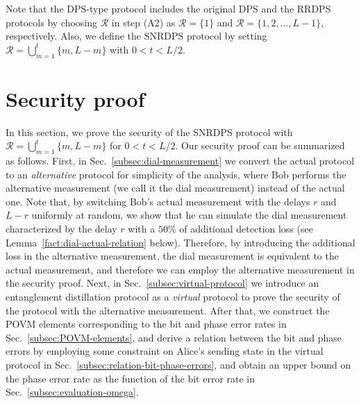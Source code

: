 \documentclass[twocolumn,superscriptaddress,pra,footinbib,notitlepage]{revtex4-1}
\newcommand{\1}{\mbox{1}\hspace{-0.25em}\mbox{l}}
\begin{document}
Note that the DPS-type protocol includes the original DPS and the RRDPS protocols by choosing $\mathcal{R}$ in step (A2) as $\mathcal{R}=\{1\}$ and $\mathcal{R}=\{1, 2, \dots, L-1\}$, respectively. 
Also, we define the SNRDPS protocol by setting $\mathcal{R}=\bigcup_{m=1}^{t}\{m, L-m\}$ with $0<t<L/2$.

\section{Security proof}
\label{sec:security-proof}
In this section, we prove the security of the SNRDPS protocol with $\mathcal{R}=\bigcup_{m=1}^{t}\{m, L-m\}$ for $0<t<L/2$. Our security proof can be summarized as follows. 
First, in Sec.~\ref{subsec:dial-measurement} we convert the actual protocol to an \textit{alternative} protocol for simplicity of the analysis, where Bob performs the alternative measurement (we call it the dial measurement) instead of the actual one. 
Note that, by switching Bob's actual measurement with the delays $r$ and $L-r$ uniformly at random, we show that he can simulate the dial measurement characterized by the delay $r$ with a $50\%$ of additional detection loss (see Lemma~\ref{fact:dial-actual-relation} below).
Therefore, by introducing the additional loss in the alternative measurement, the dial measurement is equivalent to the actual measurement, and therefore we can employ the alternative measurement in the security proof.
Next, in Sec.~\ref{subsec:virtual-protocol} we introduce an entanglement distillation protocol as a \textit{virtual} protocol to prove the security of the protocol with the alternative measurement.
After that, we construct the POVM elements corresponding to the bit and phase error rates in Sec.~\ref{subsec:POVM-elements}, and derive a relation between the bit and phase errors by employing some constraint on Alice's sending state in the virtual protocol in Sec.~\ref{subsec:relation-bit-phase-errors}, and obtain an upper bound on the phase error rate as the function of the bit error rate in Sec.~\ref{subsec:evaluation-omega}.
\end{document}
